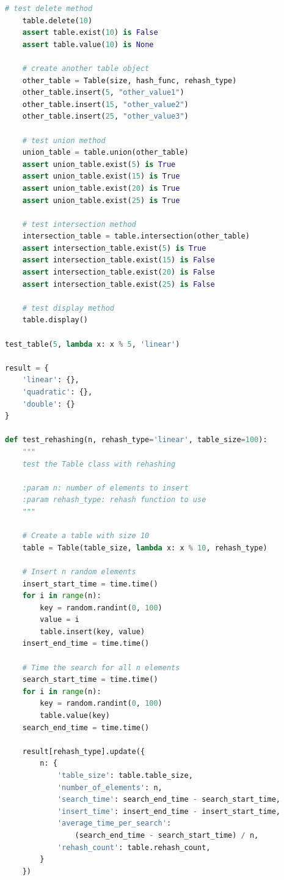 \documentclass{article}
\begin{document}
\begin{lstlisting}[language=Python,label={lst:codesrc}]
    # test delete method
    table.delete(10)
    assert table.exist(10) is False
    assert table.value(10) is None

    # create another table object
    other_table = Table(size, hash_func, rehash_type)
    other_table.insert(5, "other_value1")
    other_table.insert(15, "other_value2")
    other_table.insert(25, "other_value3")

    # test union method
    union_table = table.union(other_table)
    assert union_table.exist(5) is True
    assert union_table.exist(15) is True
    assert union_table.exist(20) is True
    assert union_table.exist(25) is True

    # test intersection method
    intersection_table = table.intersection(other_table)
    assert intersection_table.exist(5) is True
    assert intersection_table.exist(15) is False
    assert intersection_table.exist(20) is False
    assert intersection_table.exist(25) is False

    # test display method
    table.display()

test_table(5, lambda x: x % 5, 'linear')

result = {
    'linear': {},
    'quadratic': {},
    'double': {}
}

def test_rehashing(n, rehash_type='linear', table_size=100):
    """
    test the Table class with rehashing

    :param n: number of elements to insert
    :param rehash_type: rehash function to use
    """

    # Create a table with size 10
    table = Table(table_size, lambda x: x % 10, rehash_type)

    # Insert n random elements
    insert_start_time = time.time()
    for i in range(n):
        key = random.randint(0, 100)
        value = i
        table.insert(key, value)
    insert_end_time = time.time()

    # Time the search for all n elements
    search_start_time = time.time()
    for i in range(n):
        key = random.randint(0, 100)
        table.value(key)
    search_end_time = time.time()

    result[rehash_type].update({
        n: {
            'table_size': table.table_size,
            'number_of_elements': n,
            'search_time': search_end_time - search_start_time,
            'insert_time': insert_end_time - insert_start_time,
            'average_time_per_search':
                (search_end_time - search_start_time) / n,
            'rehash_count': table.rehash_count,
        }
    })


\end{lstlisting}
\end{document}
